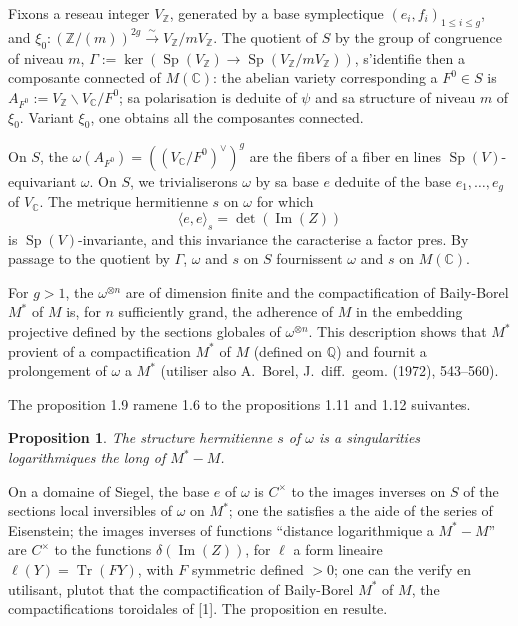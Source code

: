 \documentclass[12pt,a4paper]{article}
\theoremstyle{plain}
\newtheorem{proposition}[theorem]{Proposition}
\theoremstyle{definition}
\theoremstyle{remark}
\DeclareMathOperator{\Sp}{Sp}
\DeclareMathOperator{\Tr}{Tr}
\DeclareMathOperator{\Impartie}{Im}
\newcommand{\CC}{\mathbb{C}}
\newcommand{\QQ}{\mathbb{Q}}
\newcommand{\ZZ}{\mathbb{Z}}
\providecommand{\CC}{\mathbb{C}}
\providecommand{\QQ}{\mathbb{Q}}
\providecommand{\ZZ}{\mathbb{Z}}
\providecommand{\Tr}{\operatorname{Tr}}
\begin{document}
Fixons a reseau integer $V_\ZZ$, generated by a base symplectique $(e_i, f_i)_{1 \leq i \leq g}$, and $\xi_0 : (\ZZ/(m))^{2g} \xrightarrow{\sim} V_\ZZ/mV_\ZZ$. The quotient of $S$ by the group of congruence of niveau $m$, $\Gamma := \ker(\Sp(V_\ZZ) \to \Sp(V_\ZZ/mV_\ZZ))$, s'identifie then a composante connected of $M(\CC)$: the abelian variety corresponding a $F^0 \in S$ is $A_{F^0} := V_\ZZ \backslash V_\CC / F^0$; sa polarisation is deduite of $\psi$ and sa structure of niveau $m$ of $\xi_0$. Variant $\xi_0$, one obtains all the composantes connected.

On $S$, the $\omega(A_{F^0}) = ((V_\CC/F^0)^\vee)^g$ are the fibers of a fiber en lines $\Sp(V)$-equivariant $\omega$. On $S$, we trivialiserons $\omega$ by sa base $e$ deduite of the base $e_1, \ldots, e_g$ of $V_\CC$. The metrique hermitienne $s$ on $\omega$ for which
\[
\langle e, e \rangle_s = \det(\Impartie(Z))
\]
is $\Sp(V)$-invariante, and this invariance the caracterise a factor pres. By passage to the quotient by $\Gamma$, $\omega$ and $s$ on $S$ fournissent $\omega$ and $s$ on $M(\CC)$.

For $g > 1$, the $\omega^{\otimes n}$ are of dimension finite and the compactification of Baily-Borel $M^*$ of $M$ is, for $n$ sufficiently grand, the adherence of $M$ in the embedding projective defined by the sections globales of $\omega^{\otimes n}$. This description shows that $M^*$ provient of a compactification $M^*$ of $M$ (defined on $\QQ$) and fournit a prolongement of $\omega$ a $M^*$ (utiliser also A.~Borel, J.~diff.~geom. (1972), 543--560).

The proposition 1.9 ramene 1.6 to the propositions 1.11 and 1.12 suivantes.

\begin{proposition}
The structure hermitienne $s$ of $\omega$ is a singularities logarithmiques the long of $M^* - M$.
\end{proposition}

On a domaine of Siegel, the base $e$ of $\omega$ is $C^\times$ to the images inverses on $S$ of the sections local inversibles of $\omega$ on $M^*$; one the satisfies a the aide of the series of Eisenstein; the images inverses of functions ``distance logarithmique a $M^* - M$'' are $C^\times$ to the functions $\delta(\Impartie(Z))$, for $\ell$ a form lineaire $\ell(Y) = \Tr(FY)$, with $F$ symmetric defined $> 0$; one can the verify en utilisant, plutot that the compactification of Baily-Borel $M^*$ of $M$, the compactifications toroidales of [1]. The proposition en resulte.
\end{document}
